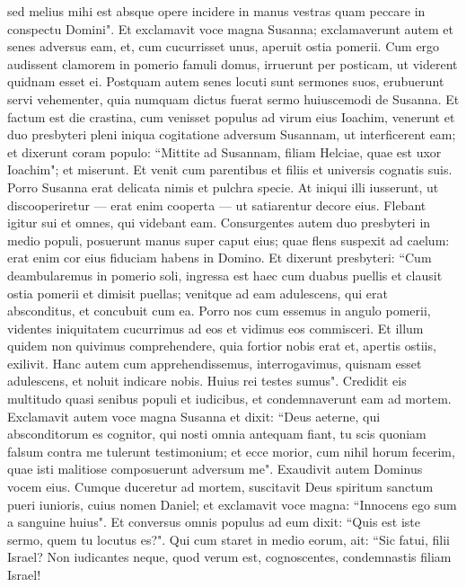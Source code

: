\begin{biblechapter}
\verse sed melius mihi est absque opere incidere in manus vestras quam peccare in conspectu Domini". 
\verse Et exclamavit voce magna Susanna; exclamaverunt autem et senes adversus eam, 
\verse et, cum cucurrisset unus, aperuit ostia pomerii. 
\verse Cum ergo audissent clamorem in pomerio famuli domus, irruerunt per posticam, ut viderent quidnam esset ei. 
\verse Postquam autem senes locuti sunt sermones suos, erubuerunt servi vehementer, quia numquam dictus fuerat sermo huiuscemodi de Susanna. Et factum est die crastina, 
\verse cum venisset populus ad virum eius Ioachim, venerunt et duo presbyteri pleni iniqua cogitatione adversum Susannam, ut interficerent eam; 
\verse et dixerunt coram populo: “Mittite ad Susannam, filiam Helciae, quae est uxor Ioachim"; et miserunt. 
\verse Et venit cum parentibus et filiis et universis cognatis suis. 
\verse Porro Susanna erat delicata nimis et pulchra specie. 
\verse At iniqui illi iusserunt, ut discooperiretur — erat enim cooperta — ut satiarentur decore eius. 
\verse Flebant igitur sui et omnes, qui videbant eam. 
\verse Consurgentes autem duo presbyteri in medio populi, posuerunt manus super caput eius; 
\verse quae flens suspexit ad caelum: erat enim cor eius fiduciam habens in Domino. 
\verse Et dixerunt presbyteri: “Cum deambularemus in pomerio soli, ingressa est haec cum duabus puellis et clausit ostia pomerii et dimisit puellas; 
\verse venitque ad eam adulescens, qui erat absconditus, et concubuit cum ea. 
\verse Porro nos cum essemus in angulo pomerii, videntes iniquitatem cucurrimus ad eos et vidimus eos commisceri. 
\verse Et illum quidem non quivimus comprehendere, quia fortior nobis erat et, apertis ostiis, exilivit. 
\verse Hanc autem cum apprehendissemus, interrogavimus, quisnam esset adulescens, et noluit indicare nobis. Huius rei testes sumus". 
\verse Credidit eis multitudo quasi senibus populi et iudicibus, et condemnaverunt eam ad mortem. 
\verse Exclamavit autem voce magna Susanna et dixit: “Deus aeterne, qui absconditorum es cognitor, qui nosti omnia antequam fiant, 
\verse tu scis quoniam falsum contra me tulerunt testimonium; et ecce morior, cum nihil horum fecerim, quae isti malitiose composuerunt adversum me". 
\verse Exaudivit autem Dominus vocem eius. 
\verse Cumque duceretur ad mortem, suscitavit Deus spiritum sanctum pueri iunioris, cuius nomen Daniel; 
\verse et exclamavit voce magna: “Innocens ego sum a sanguine huius". 
\verse Et conversus omnis populus ad eum dixit: “Quis est iste sermo, quem tu locutus es?". 
\verse Qui cum staret in medio eorum, ait: “Sic fatui, filii Israel? Non iudicantes neque, quod verum est, cognoscentes, condemnastis filiam Israel!  

\end{biblechapter}
